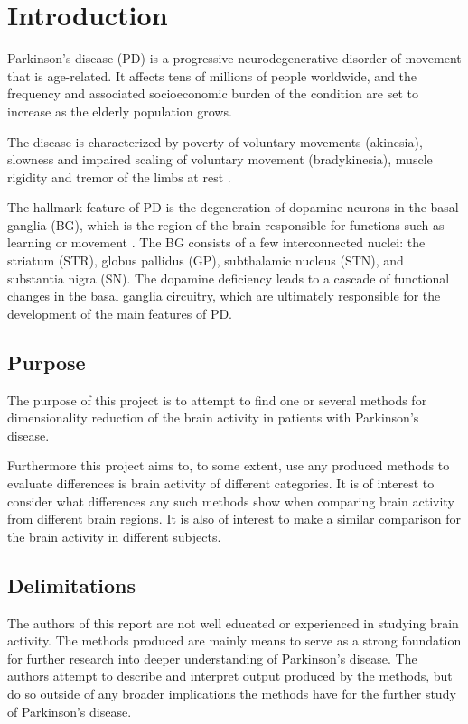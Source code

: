 \documentclass{kththesis}
\begin{document}
\tableofcontents

\mainmatter

\chapter{Introduction}

Parkinson's disease (PD) is a progressive neurodegenerative disorder of movement that is age-related. 
It affects tens of millions of people worldwide, and the frequency and associated socioeconomic burden of the condition are set to increase as the elderly population grows.

The disease is characterized by poverty of voluntary movements (akinesia), slowness and impaired scaling of voluntary movement (bradykinesia), muscle rigidity and tremor of the limbs at rest \parencite{DeMaags}.

The hallmark feature of PD is the degeneration of dopamine neurons in the basal ganglia (BG), which is the region of the brain responsible for functions such as learning or movement \parencite{Hammond}. 
The BG consists of a few interconnected nuclei: the striatum (STR), globus pallidus (GP), subthalamic nucleus (STN), and substantia nigra (SN). 
The dopamine deficiency leads to a cascade of functional changes in the basal ganglia circuitry, which are ultimately responsible for the development of the main features of PD.

\section{Purpose}

The purpose of this project is to attempt to find one or several methods for dimensionality reduction of the brain activity in patients with Parkinson's disease.

Furthermore this project aims to, to some extent, use any produced methods to evaluate differences is brain activity of different categories.
It is of interest to consider what differences any such methods show when comparing brain activity from different brain regions.
It is also of interest to make a similar comparison for the brain activity in different subjects.

\section{Delimitations}

The authors of this report are not well educated or experienced in studying brain activity.
The methods produced are mainly means to serve as a strong foundation for further research into deeper understanding of Parkinson's disease.
The authors attempt to describe and interpret output produced by the methods, but do so outside of any broader implications the methods have for the further study of Parkinson's disease.
\end{document}
